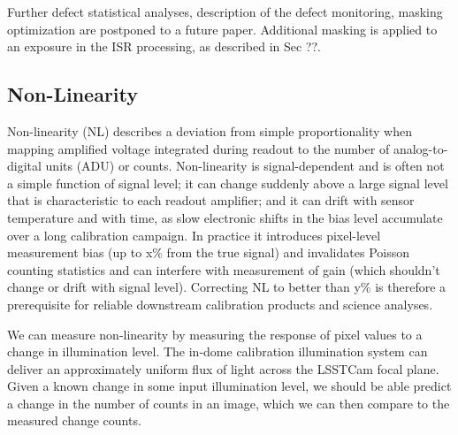 Further defect statistical analyses, description of the defect monitoring, masking optimization are postponed to a future paper.
Additional masking is applied to an exposure in the ISR processing, as described in Sec ??.

\subsection{Non-Linearity} \label{sec:processing:calibration:linearity}

Non-linearity (NL) describes a deviation from simple proportionality when mapping amplified voltage integrated during readout to the number of analog-to-digital units (ADU) or counts.
Non-linearity is signal-dependent and is often not a simple function of signal level; it can change suddenly above a large signal level that is characteristic to each readout amplifier; and it can drift with sensor temperature and with time, as slow electronic shifts in the bias level accumulate over a long calibration campaign.
In practice it introduces pixel-level measurement bias (up to x\% from the true signal) and invalidates Poisson counting statistics and can interfere with measurement of gain (which shouldn't change or drift with signal level).
Correcting NL to better than y\% is therefore a prerequisite for reliable downstream calibration products and science analyses.

We can measure non-linearity by measuring the response of pixel values to a change in illumination level.
The in-dome calibration illumination system can deliver an approximately uniform flux of light across the LSSTCam focal plane.
Given a known change in some input illumination level, we should be able predict a change in the number of counts in an image, which we can then compare to the measured change counts.

